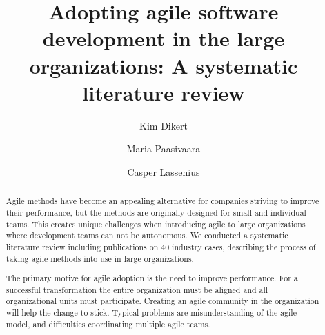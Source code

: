 \documentclass[preprint,authoryear,12pt]{elsarticle}
\begin{document}

\begin{frontmatter}



\title{Adopting agile software development in the large organizations:
       A systematic literature review}

\author{Kim Dikert}

\author{Maria Paasivaara}

\author{Casper Lassenius}

\address{Aalto University, School of Science, Department of Computer Science and Engineering}



\begin{abstract}

Agile methods have become an appealing alternative for companies striving to
improve their performance, but the methods are originally designed for small and
individual teams. This creates unique challenges when introducing agile to large
organizations where development teams can not be autonomous. We conducted a
systematic literature review including publications on 40 industry cases,
describing the process of taking agile methods into use in large organizations.

The primary motive for agile adoption is the need to improve performance. For a
successful transformation the entire organization must be aligned and all
organizational units must participate.
Creating an agile community in the organization will help the change to stick.
Typical problems are misunderstanding of the agile model, and difficulties
coordinating multiple agile teams.




\end{abstract}
\end{frontmatter}
\end{document}
